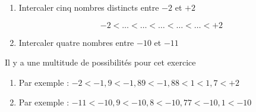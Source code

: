\begin{exercice*}[Intercaler]
    \begin{enumerate}
        \item Intercaler cinq nombres distincts entre $-2$ et $+2$

        $$-2<\ldots<\ldots<\ldots<\ldots<\ldots<+2$$
        \item Intercaler quatre nombres entre $-10$ et $-11$
    \end{enumerate}
\end{exercice*}
\begin{corrige}
    Il y a une multitude de possibilités pour cet exercice

    \begin{enumerate}
        \item Par exemple : $-2<-1,9<-1,89<-1,88<1<1,7<+2$
        \item Par exemple : $-11<-10,9<-10,8<-10,77<-10,1<-10$
    \end{enumerate}    
\end{corrige}

